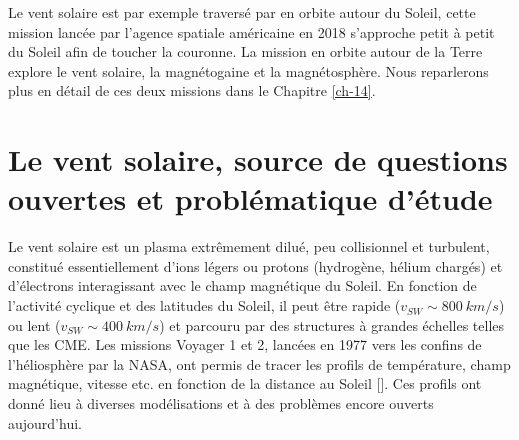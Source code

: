 Le vent solaire est par exemple traversé par  en orbite autour du Soleil, cette mission lancée par l'agence spatiale américaine  en 2018 s'approche petit à petit du Soleil afin de \og toucher \fg{} la couronne. La mission  en orbite autour de la Terre explore le vent solaire, la magnétogaine et la magnétosphère. Nous reparlerons plus en détail de ces deux missions dans le Chapitre \ref{ch-14}. 

\section{Le vent solaire, source de questions ouvertes et problématique d'étude} \label{sec-022}

Le vent solaire est un plasma extrêmement dilué, peu collisionnel et turbulent, constitué essentiellement d'ions légers ou protons (hydrogène, hélium chargés) et d'électrons interagissant avec le champ magnétique du Soleil. En fonction de l'activité cyclique et des latitudes du Soleil, il peut être rapide ($v_{SW} \sim \SI{800}{km/s}$) ou lent ($v_{SW} \sim \SI{400}{km/s}$) et parcouru par des structures à grandes échelles telles que les \ac{CME}. Les missions Voyager 1 et 2, lancées en 1977 vers les confins de l'héliosphère par la NASA, ont permis de tracer les profils de température, champ magnétique, vitesse etc. en fonction de la distance au Soleil [\cite{richardson_radial_1995}]. Ces profils ont donné lieu à diverses modélisations et à des problèmes encore ouverts aujourd'hui. 


